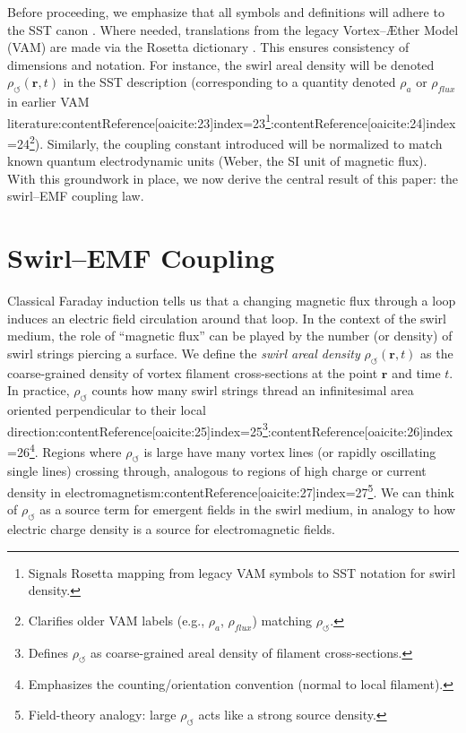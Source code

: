 \documentclass[12pt]{article}
\begin{document}
    Before proceeding, we emphasize that all symbols and definitions will adhere to the SST canon \cite{Iskandarani2025Canon}. Where needed, translations from the legacy Vortex--Æther Model (VAM) are made via the Rosetta dictionary \cite{Iskandarani2025Rosetta}. This ensures consistency of dimensions and notation. For instance, the swirl areal density will be denoted $\rho_{\!\boldsymbol{\circlearrowleft}}(\mathbf{r},t)$ in the SST description (corresponding to a quantity denoted $\rho_{\!a}$ or $\rho_{\!f\!lux}$ in earlier VAM literature:contentReference[oaicite:23]{index=23}\footnote{Signals Rosetta mapping from legacy VAM symbols to SST notation for swirl density.}:contentReference[oaicite:24]{index=24}\footnote{Clarifies older VAM labels (e.g., $\rho_a$, $\rho_{\!flux}$) matching $\rho_{\!\circlearrowleft}$.}). Similarly, the coupling constant introduced will be normalized to match known quantum electrodynamic units (Weber, the SI unit of magnetic flux). With this groundwork in place, we now derive the central result of this paper: the swirl–EMF coupling law.

\section{Swirl--EMF Coupling}\label{sec:swirlEMF}
    Classical Faraday induction tells us that a changing magnetic flux through a loop induces an electric field circulation around that loop. In the context of the swirl medium, the role of ``magnetic flux'' can be played by the number (or density) of swirl strings piercing a surface. We define the \emph{swirl areal density} $\rho_{\!\boldsymbol{\circlearrowleft}}(\mathbf{r},t)$ as the coarse-grained density of vortex filament cross-sections at the point $\mathbf{r}$ and time $t$. In practice, $\rho_{\!\boldsymbol{\circlearrowleft}}$ counts how many swirl strings thread an infinitesimal area oriented perpendicular to their local direction:contentReference[oaicite:25]{index=25}\footnote{Defines $\rho_{\!\circlearrowleft}$ as coarse-grained areal density of filament cross-sections.}:contentReference[oaicite:26]{index=26}\footnote{Emphasizes the counting/orientation convention (normal to local filament).}. Regions where $\rho_{\!\boldsymbol{\circlearrowleft}}$ is large have many vortex lines (or rapidly oscillating single lines) crossing through, analogous to regions of high charge or current density in electromagnetism:contentReference[oaicite:27]{index=27}\footnote{Field-theory analogy: large $\rho_{\!\circlearrowleft}$ acts like a strong source density.}. We can think of $\rho_{\!\boldsymbol{\circlearrowleft}}$ as a source term for emergent fields in the swirl medium, in analogy to how electric charge density is a source for electromagnetic fields.
\end{document}
